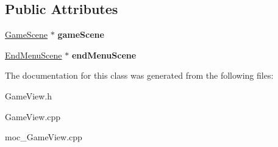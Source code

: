 \subsection*{Public Attributes}
\begin{DoxyCompactItemize}
\item 
\hyperlink{classGameScene}{Game\+Scene} $\ast$ {\bfseries game\+Scene}\hypertarget{classGameView_a7c4d2d02b91a7313d4fcfe3419eb3feb}{}\label{classGameView_a7c4d2d02b91a7313d4fcfe3419eb3feb}

\item 
\hyperlink{classEndMenuScene}{End\+Menu\+Scene} $\ast$ {\bfseries end\+Menu\+Scene}\hypertarget{classGameView_ade77636f2cd8eeb6d1bb49b524df06bb}{}\label{classGameView_ade77636f2cd8eeb6d1bb49b524df06bb}

\end{DoxyCompactItemize}


The documentation for this class was generated from the following files\+:\begin{DoxyCompactItemize}
\item 
Game\+View.\+h\item 
Game\+View.\+cpp\item 
moc\+\_\+\+Game\+View.\+cpp\end{DoxyCompactItemize}

